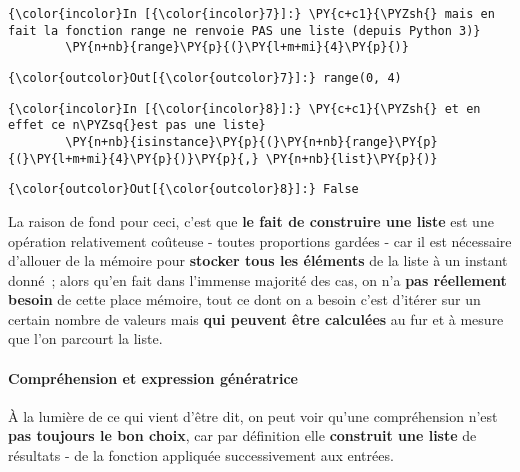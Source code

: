     \begin{Verbatim}[commandchars=\\\{\}]
{\color{incolor}In [{\color{incolor}7}]:} \PY{c+c1}{\PYZsh{} mais en fait la fonction range ne renvoie PAS une liste (depuis Python 3)}
        \PY{n+nb}{range}\PY{p}{(}\PY{l+m+mi}{4}\PY{p}{)}
\end{Verbatim}


\begin{Verbatim}[commandchars=\\\{\}]
{\color{outcolor}Out[{\color{outcolor}7}]:} range(0, 4)
\end{Verbatim}
            
    \begin{Verbatim}[commandchars=\\\{\}]
{\color{incolor}In [{\color{incolor}8}]:} \PY{c+c1}{\PYZsh{} et en effet ce n\PYZsq{}est pas une liste}
        \PY{n+nb}{isinstance}\PY{p}{(}\PY{n+nb}{range}\PY{p}{(}\PY{l+m+mi}{4}\PY{p}{)}\PY{p}{,} \PY{n+nb}{list}\PY{p}{)}
\end{Verbatim}


\begin{Verbatim}[commandchars=\\\{\}]
{\color{outcolor}Out[{\color{outcolor}8}]:} False
\end{Verbatim}
            
    La raison de fond pour ceci, c'est que \textbf{le fait de construire une
liste} est une opération relativement coûteuse - toutes proportions
gardées - car il est nécessaire d'allouer de la mémoire pour
\textbf{stocker tous les éléments} de la liste à un instant donné~;
alors qu'en fait dans l'immense majorité des cas, on n'a \textbf{pas
réellement besoin} de cette place mémoire, tout ce dont on a besoin
c'est d'itérer sur un certain nombre de valeurs mais \textbf{qui peuvent
être calculées} au fur et à mesure que l'on parcourt la liste.

    \hypertarget{compruxe9hension-et-expression-guxe9nuxe9ratrice}{%
\paragraph{Compréhension et expression
génératrice}\label{compruxe9hension-et-expression-guxe9nuxe9ratrice}}

    À la lumière de ce qui vient d'être dit, on peut voir qu'une
compréhension n'est \textbf{pas toujours le bon choix}, car par
définition elle \textbf{construit une liste} de résultats - de la
fonction appliquée successivement aux entrées.

